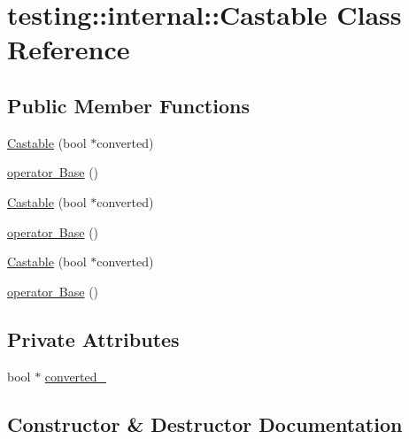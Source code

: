 \hypertarget{classtesting_1_1internal_1_1_castable}{}\section{testing\+::internal\+::Castable Class Reference}
\label{classtesting_1_1internal_1_1_castable}
\subsection*{Public Member Functions}
\begin{DoxyCompactItemize}
\item 
\mbox{\hyperlink{classtesting_1_1internal_1_1_castable_a705d519a227d38ff5c174905316f62c4}{Castable}} (bool $\ast$converted)
\item 
\mbox{\hyperlink{classtesting_1_1internal_1_1_castable_ac60b2e7885f3b09defb829eddaa0afd9}{operator Base}} ()
\item 
\mbox{\hyperlink{classtesting_1_1internal_1_1_castable_a705d519a227d38ff5c174905316f62c4}{Castable}} (bool $\ast$converted)
\item 
\mbox{\hyperlink{classtesting_1_1internal_1_1_castable_ac60b2e7885f3b09defb829eddaa0afd9}{operator Base}} ()
\item 
\mbox{\hyperlink{classtesting_1_1internal_1_1_castable_a705d519a227d38ff5c174905316f62c4}{Castable}} (bool $\ast$converted)
\item 
\mbox{\hyperlink{classtesting_1_1internal_1_1_castable_ac60b2e7885f3b09defb829eddaa0afd9}{operator Base}} ()
\end{DoxyCompactItemize}
\subsection*{Private Attributes}
\begin{DoxyCompactItemize}
\item 
bool $\ast$ \mbox{\hyperlink{classtesting_1_1internal_1_1_castable_af7be4df2e80181ffdd7762d4a10e08b1}{converted\+\_\+}}
\end{DoxyCompactItemize}


\subsection{Constructor \& Destructor Documentation}
\mbox{\label{classtesting_1_1internal_1_1_castable_a705d519a227d38ff5c174905316f62c4}} 
